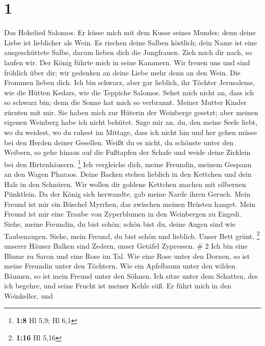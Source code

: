 \hypertarget{section}{%
\section{1}\label{section}}

 Das Hohelied Salomos.  Er küsse mich mit dem
Kusse seines Mundes; denn deine Liebe ist lieblicher als Wein.
 Es riechen deine Salben köstlich; dein Name ist eine
ausgeschüttete Salbe, darum lieben dich die Jungfrauen. 
Zieh mich dir nach, so laufen wir. Der König führte mich in seine
Kammern. Wir freuen uns und sind fröhlich über dir; wir gedenken an
deine Liebe mehr denn an den Wein. Die Frommen lieben dich. 
Ich bin schwarz, aber gar lieblich, ihr Töchter Jerusalems, wie die
Hütten Kedars, wie die Teppiche Salomos.  Sehet mich nicht
an, dass ich so schwarz bin; denn die Sonne hat mich so verbrannt.
Meiner Mutter Kinder zürnten mit mir. Sie haben mich zur Hüterin der
Weinberge gesetzt; aber meinen eigenen Weinberg habe ich nicht behütet.
 Sage mir an, du, den meine Seele liebt, wo du weidest, wo
du ruhest im Mittage, dass ich nicht hin und her gehen müsse bei den
Herden deiner Gesellen.  Weißt du es nicht, du schönste
unter den Weibern, so gehe hinaus auf die Fußtapfen der Schafe und weide
deine Zicklein bei den Hirtenhäusern. \footnote{\textbf{1:8} Hl 5,9; Hl
  6,1}  Ich vergleiche dich, meine Freundin, meinem Gespann
an den Wagen Pharaos.  Deine Backen stehen lieblich in den
Kettchen und dein Hals in den Schnüren.  Wir wollen dir
goldene Kettchen machen mit silbernen Pünktlein.  Da der
König sich herwandte, gab meine Narde ihren Geruch.  Mein
Freund ist mir ein Büschel Myrrhen, das zwischen meinen Brüsten hanget.
 Mein Freund ist mir eine Traube von Zyperblumen in den
Weinbergen zu Engedi.  Siehe, meine Freundin, du bist
schön; schön bist du, deine Augen sind wie Taubenaugen. 
Siehe, mein Freund, du bist schön und lieblich. Unser Bett grünt,
\footnote{\textbf{1:16} Hl 5,16}  unserer Häuser Balken
sind Zedern, unser Getäfel Zypressen. \# 2  Ich bin eine
Blume zu Saron und eine Rose im Tal.  Wie eine Rose unter
den Dornen, so ist meine Freundin unter den Töchtern.  Wie
ein Apfelbaum unter den wilden Bäumen, so ist mein Freund unter den
Söhnen. Ich sitze unter dem Schatten, des ich begehre, und seine Frucht
ist meiner Kehle süß.  Er führt mich in den Weinkeller, und
